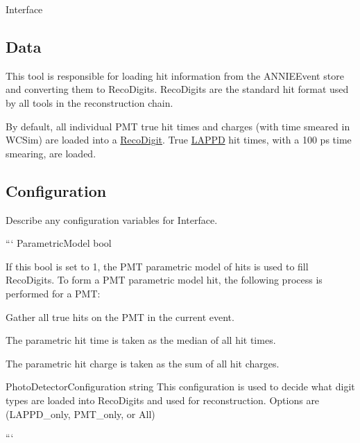 Interface

\subsection*{Data}

This tool is responsible for loading hit information from the A\-N\-N\-I\-E\-Event store and converting them to Reco\-Digits. Reco\-Digits are the standard hit format used by all tools in the reconstruction chain.

By default, all individual P\-M\-T true hit times and charges (with time smeared in W\-C\-Sim) are loaded into a \hyperlink{classRecoDigit}{Reco\-Digit}. True \hyperlink{classLAPPD}{L\-A\-P\-P\-D} hit times, with a 100 ps time smearing, are loaded.

\subsection*{Configuration}

Describe any configuration variables for Interface.

``` Parametric\-Model bool

If this bool is set to 1, the P\-M\-T parametric model of hits is used to fill Reco\-Digits. To form a P\-M\-T parametric model hit, the following process is performed for a P\-M\-T\-:
\begin{DoxyItemize}
\item Gather all true hits on the P\-M\-T in the current event.
\item The parametric hit time is taken as the median of all hit times.
\item The parametric hit charge is taken as the sum of all hit charges.
\end{DoxyItemize}

Photo\-Detector\-Configuration string This configuration is used to decide what digit types are loaded into Reco\-Digits and used for reconstruction. Options are (L\-A\-P\-P\-D\-\_\-only, P\-M\-T\-\_\-only, or All)

``` 